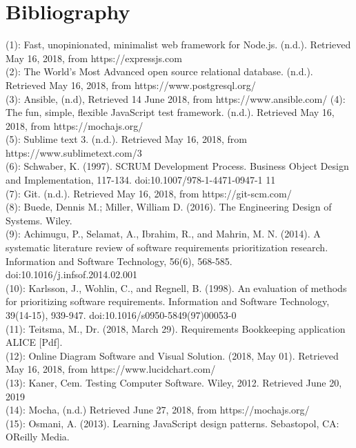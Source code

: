 \documentclass[paper=a4, fontsize=11pt,twoside]{scrartcl}	%
\begin{document}
\section{Bibliography}
(1): Fast, unopinionated, minimalist web framework for Node.js. (n.d.). Retrieved May 16, 2018, from https://expressjs.com \\ 
(2): The World's Most Advanced open source relational database. (n.d.). Retrieved May 16, 2018, from https://www.postgresql.org/ \\
(3): Ansible, (n.d), Retrieved 14 June 2018, from https://www.ansible.com/
(4): The fun, simple, flexible JavaScript test framework. (n.d.). Retrieved May 16, 2018, from https://mochajs.org/ \\
(5): Sublime text 3. (n.d.). Retrieved May 16, 2018, from https://www.sublimetext.com/3 \\
(6): Schwaber, K. (1997). SCRUM Development Process. Business Object Design and Implementation, 117-134. doi:10.1007/978-1-4471-0947-1 11\\ 
(7): Git. (n.d.). Retrieved May 16, 2018, from https://git-scm.com/ \\
(8): Buede, Dennis M.; Miller, William D. (2016). The Engineering Design of Systems. Wiley. \\
(9): Achimugu, P., Selamat, A., Ibrahim, R., and Mahrin, M. N. (2014). A systematic literature review of software requirements prioritization research. Information and Software Technology, 56(6), 568-585. doi:10.1016/j.infsof.2014.02.001 \\
(10): Karlsson, J., Wohlin, C., and Regnell, B. (1998). An evaluation of methods for prioritizing software requirements. Information and Software Technology, 39(14-15), 939-947. doi:10.1016/s0950-5849(97)00053-0 \\
(11): Teitsma, M., Dr. (2018, March 29). Requirements Bookkeeping application ALICE [Pdf]. \\
(12): Online Diagram Software and Visual Solution. (2018, May 01). Retrieved May 16, 2018, from https://www.lucidchart.com/ \\
(13): Kaner, Cem. Testing Computer Software. Wiley, 2012.
 Retrieved June 20, 2019 \\
(14): Mocha, (n.d.) Retrieved June 27, 2018, from https://mochajs.org/ \\
(15): Osmani, A. (2013). Learning JavaScript design patterns. Sebastopol, CA: OReilly Media.
 
\end{document}
